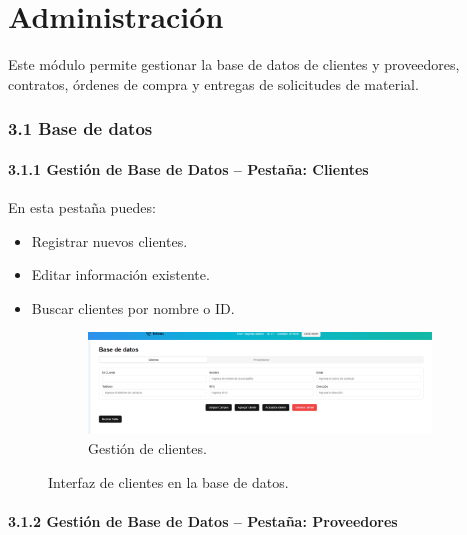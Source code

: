 \chapter{Administración }


Este módulo permite gestionar la base de datos de clientes y proveedores, contratos, órdenes de compra y entregas de solicitudes de material.
\newpage
\pagestyle{fancy}

\subsection{3.1 Base de datos}

\subsubsection{3.1.1 Gestión de Base de Datos – Pestaña: Clientes}

En esta pestaña puedes:

\begin{itemize}
    \item Registrar nuevos clientes.
    \item Editar información existente.
    \item Buscar clientes por nombre o ID.
\end{itemize}

\begin{figure}[h]
\centering
\begin{subfigure}{0.4\textwidth}
    \includegraphics[width=\textwidth]{imgs/Administracion/BASE DE DATOS/administracion-BASEDEDATOS/ad_bd_provedores_tabla.png}
    \caption{Gestión de clientes.}
    \label{fig:admin1}
\end{subfigure}
\caption{Interfaz de clientes en la base de datos.}
\end{figure}

\subsubsection{3.1.2 Gestión de Base de Datos – Pestaña: Proveedores}

